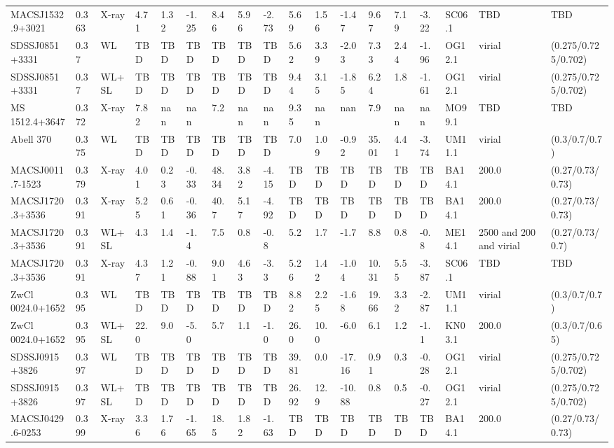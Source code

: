 \documentclass{article}
\begin{document}
\begin{center}
\begin{landscape}
\begin{longtable}{llllllllllllllllll}
MACSJ1532.9+3021 & 0.363 & X-ray & 4.71 & 1.32 & -1.25 & 8.46 & 5.96 & -2.73 & 5.69 & 1.56 & -1.47 & 9.67 & 7.19 & -3.22 & SC06.1 & TBD & TBD \\
SDSSJ0851+3331 & 0.37 & WL & TBD & TBD & TBD & TBD & TBD & TBD & 5.62 & 3.39 & -2.03 & 7.33 & 2.44 & -1.96 & OG12.1 & virial & (0.275/0.725/0.702) \\
SDSSJ0851+3331 & 0.37 & WL+SL & TBD & TBD & TBD & TBD & TBD & TBD & 9.44 & 3.15 & -1.85 & 6.24 & 1.8 & -1.61 & OG12.1 & virial & (0.275/0.725/0.702) \\
MS 1512.4+3647 & 0.372 & X-ray & 7.82 & nan & nan & 7.2 & nan & nan & 9.35 & nan & nan & 7.9 & nan & nan & MO99.1 & TBD & TBD \\
Abell 370 & 0.375 & WL & TBD & TBD & TBD & TBD & TBD & TBD & 7.0 & 1.09 & -0.92 & 35.01 & 4.41 & -3.74 & UM11.1 & virial & (0.3/0.7/0.7) \\
MACSJ0011.7-1523 & 0.379 & X-ray & 4.01 & 0.23 & -0.33 & 48.34 & 3.82 & -4.15 & TBD & TBD & TBD & TBD & TBD & TBD & BA14.1 & 200.0 & (0.27/0.73/0.73) \\
MACSJ1720.3+3536 & 0.391 & X-ray & 5.25 & 0.61 & -0.36 & 40.7 & 5.17 & -4.92 & TBD & TBD & TBD & TBD & TBD & TBD & BA14.1 & 200.0 & (0.27/0.73/0.73) \\
MACSJ1720.3+3536 & 0.391 & WL+SL & 4.3 & 1.4 & -1.4 & 7.5 & 0.8 & -0.8 & 5.2 & 1.7 & -1.7 & 8.8 & 0.8 & -0.8 & ME14.1 & 2500 and 200 and virial & (0.27/0.73/0.7) \\
MACSJ1720.3+3536 & 0.391 & X-ray & 4.37 & 1.21 & -0.88 & 9.01 & 4.63 & -3.3 & 5.26 & 1.42 & -1.04 & 10.31 & 5.55 & -3.87 & SC06.1 & TBD & TBD \\
ZwCl 0024.0+1652 & 0.395 & WL & TBD & TBD & TBD & TBD & TBD & TBD & 8.82 & 2.25 & -1.68 & 19.66 & 3.32 & -2.87 & UM11.1 & virial & (0.3/0.7/0.7) \\
ZwCl 0024.0+1652 & 0.395 & WL+SL & 22.0 & 9.0 & -5.0 & 5.7 & 1.1 & -1.0 & 26.0 & 10.0 & -6.0 & 6.1 & 1.2 & -1.1 & KN03.1 & 200.0 & (0.3/0.7/0.65) \\
SDSSJ0915+3826 & 0.397 & WL & TBD & TBD & TBD & TBD & TBD & TBD & 39.81 & 0.0 & -17.16 & 0.91 & 0.3 & -0.28 & OG12.1 & virial & (0.275/0.725/0.702) \\
SDSSJ0915+3826 & 0.397 & WL+SL & TBD & TBD & TBD & TBD & TBD & TBD & 26.92 & 12.9 & -10.88 & 0.8 & 0.5 & -0.27 & OG12.1 & virial & (0.275/0.725/0.702) \\
MACSJ0429.6-0253 & 0.399 & X-ray & 3.36 & 1.76 & -1.65 & 18.5 & 1.82 & -1.63 & TBD & TBD & TBD & TBD & TBD & TBD & BA14.1 & 200.0 & (0.27/0.73/0.73) \\

\end{longtable}
\end{landscape}
\end{center}
\end{document}
